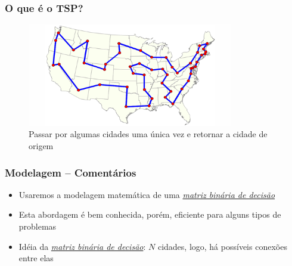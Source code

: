 \begin{frame}[fragile]

\frametitle{O que é o TSP?}

\begin{figure}[!htb]
\begin{center}
\includegraphics[width=0.80\textwidth, height=0.50\textheight]{figures/tsp01.jpg}
\caption{Passar por algumas cidades uma única vez e retornar a cidade de origem}
\end{center}
\end{figure}
    
\end{frame}



\begin{frame}[fragile] 

\frametitle{Modelagem -- Comentários}

\begin{itemize}
  \item Usaremos a modelagem matemática de uma \textit{\underline{matriz binária de decisão}}
  
  \pause
  \item Esta abordagem é bem conhecida, porém, eficiente para alguns tipos de problemas

  \pause
  \item Idéia da \textit{\underline{matriz binária de decisão}}: $N$ cidades, logo, há possíveis
  conexões entre elas 
  

\end{itemize}

\end{frame}


